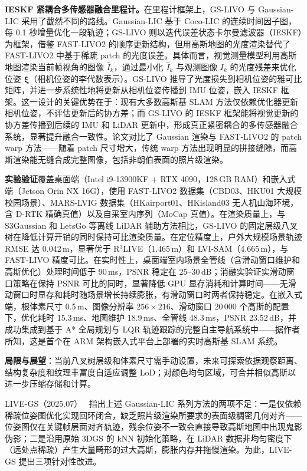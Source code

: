 \textbf{IESKF 紧耦合多传感器融合里程计。}在里程计框架上，GS-LIVO 与 Gaussian-LIC 采用了截然不同的路线。Gaussian-LIC 基于 Coco-LIC 的连续时间因子图，每 0.1 秒增量优化一段轨迹；GS-LIVO 则以迭代误差状态卡尔曼滤波器（IESKF）为框架，借鉴 FAST-LIVO2 的顺序更新结构，但用高斯地图的光度渲染替代了 FAST-LIVO2 中基于稀疏 patch 的光度误差。具体而言，视觉测量模型利用高斯地图渲染当前帧视角的图像 $\hat{I}_k$，通过最小化 $\hat{I}_k$ 与观测图像 $I_k$ 的光度残差来优化位姿 $\boldsymbol{\xi}$（相机位姿的李代数表示）。GS-LIVO 推导了光度损失到相机位姿的雅可比矩阵，并进一步系统性地将更新从相机位姿传播到 IMU 位姿，嵌入 IESKF 框架。这一设计的关键优势在于：现有大多数高斯基 SLAM 方法仅依赖优化器更新相机位姿，不评估更新后的协方差；而 GS-LIVO 的 IESKF 框架能将视觉更新的协方差传播到后续的 IMU 和 LiDAR 更新中，形成真正紧密耦合的多传感器融合系统，显著提升融合一致性。论文对比了 Gaussian 渲染与 FAST-LIVO2 的 patch warp 方法——随着 patch 尺寸增大，传统 warp 方法出现明显的拼接缝隙，而高斯渲染能无缝合成完整图像，包括非朗伯表面的照片级渲染。

\textbf{实验验证}覆盖桌面端（Intel i9-13900KF + RTX 4090，128\,GB RAM）和嵌入式端（Jetson Orin NX 16G），使用 FAST-LIVO2 数据集（CBD03、HKU01 大规模校园场景）、MARS-LVIG 数据集（HKairport01、HKisland03 无人机山海环境，含 D-RTK 精确真值）以及自采室内序列（MoCap 真值）。在渲染质量上，与 S3Gaussian 和 LetsGo 等离线 LiDAR 辅助方法相比，GS-LIVO 的固定层级八叉树在降低计算开销的同时保持可比渲染质量。在定位精度上，户外大规模场景轨迹 RMSE 达 0.042\,m，显著优于 R$^3$LIVE（1.465\,m）和 LVI-SAM（4.665\,m），与 FAST-LIVO 精度可比。在实时性上，桌面端室内场景全管线（含滑动窗口维护和高斯优化）处理时间低于 90\,ms，PSNR 稳定在 25--30\,dB；消融实验证实滑动窗口策略在保持 PSNR 可比的同时，显著降低 GPU 显存消耗和计算时间——无滑动窗口时显存和耗时随场景增长持续膨胀，有滑动窗口时两者保持稳定。在嵌入式端，根体素尺寸 0.5\,m、图像分辨率 $256 \times 216$、滑动窗口 20\,000 个高斯的配置下，优化耗时 15.3\,ms、地图维护 18.9\,ms、全管线 48.3\,ms，PSNR 23.52\,dB，并成功集成到基于 A* 全局规划与 LQR 轨迹跟踪的完整自主导航系统中——据作者所知，这是首个在 ARM 架构嵌入式平台上部署的实时高斯基 SLAM 系统。

\textbf{局限与展望}：当前八叉树层级和体素尺寸需手动设置，未来可探索依据观察距离、结构复杂度和纹理丰富度自适应调整 LoD；对颜色均匀区域，可合并相似高斯以进一步压缩存储和计算。

LIVE-GS（2025.07）~\cite{2507_23273} 指出上述 Gaussian-LIC 系列方法的两项不足：一是仅依赖稀疏位姿图优化实现回环闭合，缺乏照片级渲染所要求的表面级稠密几何对齐——位姿图仅在关键帧层面对齐轨迹，残余位姿不一致会直接导致高斯地图中出现鬼影伪影；二是沿用原始 3DGS 的 kNN 初始化策略，在 LiDAR 数据非均匀密度下（远处点稀疏）产生大量畸形的过大高斯，膨胀内存并拖慢渲染。为此，LIVE-GS 提出三项针对性改进。

